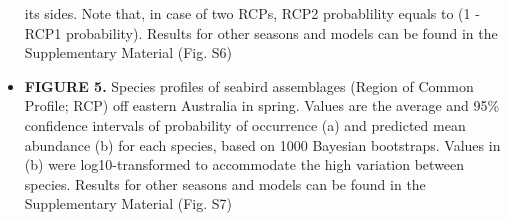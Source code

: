 \documentclass{article}
\begin{document}
\begin{itemize}
  its sides. Note that, in case of two RCPs, RCP2 probablility equals to
  (1 - RCP1 probability). Results for other seasons and models can be
  found in the Supplementary Material (Fig. S6)
\item
  \textbf{FIGURE 5.} Species profiles of seabird assemblages (Region of
  Common Profile; RCP) off eastern Australia in spring. Values are the
  average and 95\% confidence intervals of probability of occurrence (a)
  and predicted mean abundance (b) for each species, based on 1000
  Bayesian bootstraps. Values in (b) were log10-transformed to
  accommodate the high variation between species. Results for other
  seasons and models can be found in the Supplementary Material (Fig.
  S7)
\end{itemize}

\begin{landscape}

\begin{table}


\end{table}
\end{landscape}
\end{document}
